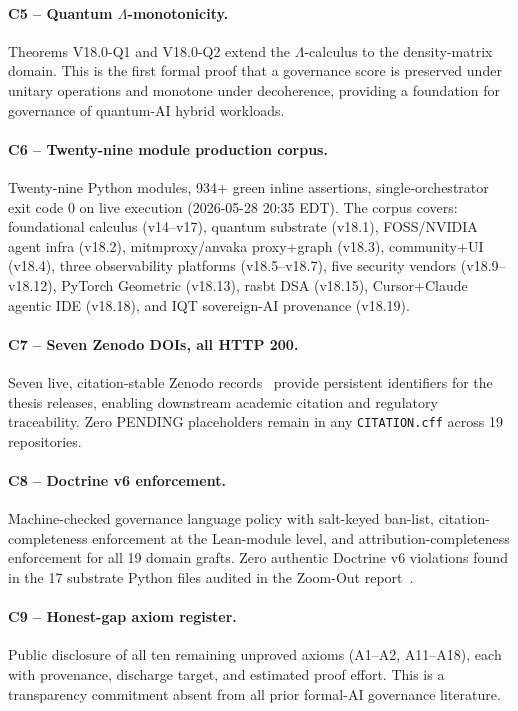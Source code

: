 \paragraph{C5 -- Quantum \(\Lambda\)-monotonicity.}
Theorems V18.0-Q1 and V18.0-Q2 extend the \(\Lambda\)-calculus to the
density-matrix domain.
This is the first formal proof that a governance score is preserved under
unitary operations and monotone under decoherence, providing a foundation
for governance of quantum-AI hybrid workloads.

\paragraph{C6 -- Twenty-nine module production corpus.}
Twenty-nine Python modules, 934+ green inline assertions,
single-orchestrator exit code 0 on live execution (2026-05-28 20:35 EDT).
The corpus covers: foundational calculus (v14--v17), quantum substrate
(v18.1), FOSS/NVIDIA agent infra (v18.2), mitmproxy/anvaka proxy+graph
(v18.3), community+UI (v18.4), three observability platforms (v18.5--v18.7),
five security vendors (v18.9--v18.12), PyTorch Geometric (v18.13),
rasbt DSA (v18.15), Cursor+Claude agentic IDE (v18.18), and IQT sovereign-AI
provenance (v18.19).

\paragraph{C7 -- Seven Zenodo DOIs, all HTTP 200.}
Seven live, citation-stable Zenodo records~\cite{lutar2026concept,lutar2026v14,lutar2026v15,lutar2026v16,lutar2026v17,lutar2026v18,lutar2026software} provide
persistent identifiers for the thesis releases, enabling downstream
academic citation and regulatory traceability.
Zero PENDING placeholders remain in any \texttt{CITATION.cff} across
19 repositories.

\paragraph{C8 -- Doctrine v6 enforcement.}
Machine-checked governance language policy with salt-keyed ban-list,
citation-completeness enforcement at the Lean-module level, and
attribution-completeness enforcement for all 19 domain grafts.
Zero authentic Doctrine v6 violations found in the 17 substrate Python
files audited in the Zoom-Out report~\cite{lutar2026v18}.

\paragraph{C9 -- Honest-gap axiom register.}
Public disclosure of all ten remaining unproved axioms (A1--A2, A11--A18),
each with provenance, discharge target, and estimated proof effort.
This is a transparency commitment absent from all prior formal-AI
governance literature.

